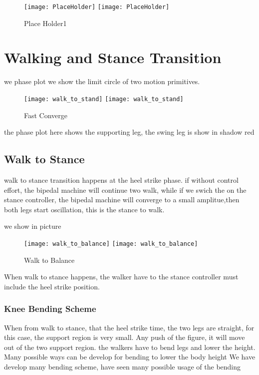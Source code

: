 \begin{figure}[!htbp]
  \begin{center}
    \leavevmode
    \ifpdf
      \texttt{[image: PlaceHolder]}
    \else
      \texttt{[image: PlaceHolder]}
    \fi
    \caption{Place Holder1}
    \label{fig:stancefall}
\end{center}
\end{figure}



\section{Walking and Stance Transition}
we phase plot we show the limit circle of two motion primitives.

\begin{figure}[!htbp]
  \begin{center}
    \leavevmode
    \ifpdf
      \texttt{[image: walk\_to\_stand]}
    \else
      \texttt{[image: walk\_to\_stand]}
    \fi
    \caption{Fast Converge}
    \label{fig:fastconverg}
\end{center}
\end{figure}

the phase plot here shows the supporting leg, the swing leg is show in shadow red


\subsection{Walk to Stance}
walk to stance transition happens at the heel strike phase.
if without control effort, the bipedal machine will continue two walk, while if we swich the on the stance controller,
the bipedal machine will converge to a small amplitue,then both legs start oscillation, this is the stance to walk.

we show in picture
\begin{figure}[!htbp]
  \begin{center}
    \leavevmode
    \ifpdf
      \texttt{[image: walk\_to\_balance]}
    \else
      \texttt{[image: walk\_to\_balance]}
    \fi
    \caption{Walk to Balance}
    \label{fig:walk to balance}
\end{center}
\end{figure}

When walk to stance happens, the walker have to the stance controller must include the heel strike position.


\subsubsection*{Knee Bending Scheme}
When from walk to stance, that the heel strike time, the two legs are straight, for this case, the support region is very small.
Any push of the figure, it will move out of the two support region.
the walkers have to bend legs and lower the height.
Many possible ways can be develop for bending to lower the body height
We have develop many bending scheme, have seen many possible usage of the bending

